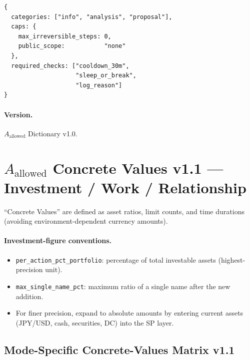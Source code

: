 \begin{lstlisting}[basicstyle=\ttfamily\small,frame=single]
{
  categories: ["info", "analysis", "proposal"],
  caps: {
    max_irreversible_steps: 0,
    public_scope:           "none"
  },
  required_checks: ["cooldown_30m",
                    "sleep_or_break",
                    "log_reason"]
}
\end{lstlisting}

\paragraph{Version.}
$A_{\mathrm{allowed}}$ Dictionary v1.0.

\section{$A_{\mathrm{allowed}}$ Concrete Values v1.1 ---
Investment / Work / Relationship}
\label{sec:a-allowed-concrete-values}

``Concrete Values'' are defined as asset ratios, limit counts, and
time durations (avoiding environment-dependent currency amounts).

\paragraph{Investment-figure conventions.}

\begin{itemize}
\item \texttt{per\_action\_pct\_portfolio}: percentage of total
investable assets (highest-precision unit).
\item \texttt{max\_single\_name\_pct}: maximum ratio of a single
name after the new addition.
\item For finer precision, expand to absolute amounts by entering
current assets (JPY/USD, cash, securities, DC) into the SP layer.
\end{itemize}

\subsection{Mode-Specific Concrete-Values Matrix v1.1}
\label{sec:a-allowed-concrete-matrix}

